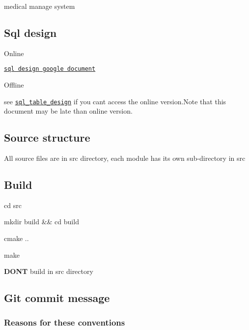 medical manage system

\subsection*{Sql design}


\begin{DoxyItemize}
\item Online

\href{https://docs.google.com/document/d/1QlFliN9hr0bRWUpu1whWGgTl2qbUMroOrxDV7gtdL20/edit}{\tt sql design google document}
\item Offline

see \href{https://htmlpreview.github.io/?https://github.com/advanced-data-processing-company/vincent/blob/master/sql_table_design.html}{\tt sql\+\_\+table\+\_\+design} if you can\textquotesingle{}t access the online version.\+Note that this document may be late than online version. \subsection*{Source structure}
\end{DoxyItemize}

All source files are in {\ttfamily src} directory, each module has its own sub-\/directory in {\ttfamily src}

\subsection*{Build}


\begin{DoxyEnumerate}
\item {\ttfamily cd src}
\item {\ttfamily mkdir build \&\& cd build}
\item {\ttfamily cmake ..}
\item {\ttfamily make}
\end{DoxyEnumerate}
\begin{DoxyItemize}
\item {\bfseries D\+O\+NT} build in {\ttfamily src} directory
\end{DoxyItemize}

\subsection*{Git commit message}

\subsubsection*{Reasons for these conventions}


